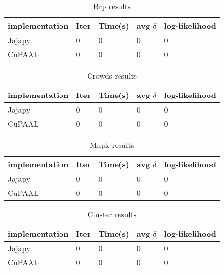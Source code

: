 \begin{table}[!htb]
    \centering
    \caption{Brp results}
    \label{tab:brp_results}
    \begin{tabular}{lllll}
        \toprule
        implementation & Iter & Time(s) & avg $\delta$ & log-likelihood \\
        \midrule
        Jajapy         & 0    & 0       & 0            & 0              \\
        CuPAAL         & 0    & 0       & 0            & 0              \\
        \bottomrule
    \end{tabular}
\end{table}

\begin{table}[!htb]
    \centering
    \caption{Crowds results}
    \label{tab:crowds_results}
    \begin{tabular}{lllll}
        \toprule
        implementation & Iter & Time(s) & avg $\delta$ & log-likelihood \\
        \midrule
        Jajapy         & 0    & 0       & 0            & 0              \\
        CuPAAL         & 0    & 0       & 0            & 0              \\
        \bottomrule
    \end{tabular}
\end{table}

\begin{table}[!htb]
    \centering
    \caption{Mapk results}
    \label{tab:mapk_results}
    \begin{tabular}{lllll}
        \toprule
        implementation & Iter & Time(s) & avg $\delta$ & log-likelihood \\
        \midrule
        Jajapy         & 0    & 0       & 0            & 0              \\
        CuPAAL         & 0    & 0       & 0            & 0              \\
        \bottomrule
    \end{tabular}
\end{table}

\begin{table}[!htb]
    \centering
    \caption{Cluster results}
    \label{tab:cluster_results}
    \begin{tabular}{lllll}
        \toprule
        implementation & Iter & Time(s) & avg $\delta$ & log-likelihood \\
        \midrule
        Jajapy         & 0    & 0       & 0            & 0              \\
        CuPAAL         & 0    & 0       & 0            & 0              \\
        \bottomrule
    \end{tabular}
\end{table}

